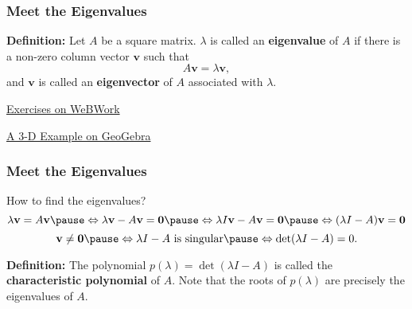 \documentclass[10pt]{beamer}
\begin{document}
\begin{frame}
\frametitle{Meet the Eigenvalues}
\begin{tcolorbox}
{\bf Definition:} Let $A$ be a square matrix. $\lambda$ is called an {\bf eigenvalue} of $A$ if there is a non-zero column vector $\mathbf v$ such that 
\[
A\mathbf v = \lambda\mathbf v,
\]
and $\mathbf v$ is called an {\bf eigenvector} of $A$ associated with $\lambda$.
\end{tcolorbox}\pause

\vspace{1em}
\href{https://webwork.messiah.edu/webwork2/MATH261_2025SP/Eigenvalues_and_Eigenvectors/1}{Exercises on WeBWork}

\vspace{1em}
\pause
\href{https://www.geogebra.org/3d/q9rzs2af}{A 3-D Example on GeoGebra}
\end{frame}

\begin{frame}
\frametitle{Meet the Eigenvalues}
How to find the eigenvalues?\pause
\[
\lambda\mathbf v = A\mathbf v\pause \Leftrightarrow \lambda\mathbf v - A\mathbf v = \mathbf 0\pause \Leftrightarrow
  \lambda I\mathbf v - A\mathbf v  = \mathbf 0 \pause \Leftrightarrow ( \lambda I - A)\mathbf v = \mathbf 0 \]
\pause
\[
\mathbf v \ne \mathbf 0\pause  \Leftrightarrow \lambda I - A\text{ is singular}\pause \Leftrightarrow \det(\lambda I - A) = 0.
\]
\pause
\begin{tcolorbox}
{\bf Definition:} The polynomial $p(\lambda) = \det(\lambda I - A)$ is called the {\bf characteristic polynomial} of $A$. Note that the roots of $p(\lambda)$ are precisely the eigenvalues of $A$.
\end{tcolorbox}
\end{frame}
\end{document}
